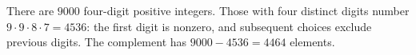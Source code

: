 There are $9000$ four-digit positive integers. Those with four distinct digits number $9\cdot9\cdot8\cdot7=4536$: the first digit is nonzero, and subsequent choices exclude previous digits. The complement has $9000-4536=\boxed{4464}$ elements.
